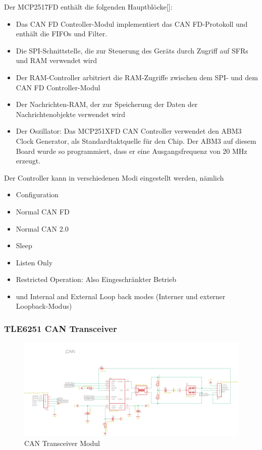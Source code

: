 Der MCP2517FD enthält die folgenden Hauptblöcke[\cite{Transmission2018}]:
\begin{itemize}
	\item Das CAN FD Controller-Modul implementiert das CAN FD-Protokoll und enthält die FIFOs und Filter.
	\item Die SPI-Schnittstelle, die zur Steuerung des Geräts durch Zugriff auf SFRs und RAM verwendet wird
	\item Der RAM-Controller arbitriert die RAM-Zugriffe zwischen dem SPI- und dem CAN FD Controller-Modul
	\item Der Nachrichten-RAM, der zur Speicherung der Daten der Nachrichtenobjekte verwendet wird
	\item Der Oszillator: Das MCP251XFD CAN Controller verwendet den ABM3 Clock Generator, als Standardtaktquelle für den Chip. Der ABM3 auf diesem Board wurde so programmiert, dass er eine Ausgangsfrequenz von 20 MHz erzeugt.
	
\end{itemize}

Der Controller kann in verschiedenen Modi eingestellt werden, nämlich
\begin{itemize}
	\item Configuration
	\item Normal CAN FD
	\item Normal CAN 2.0
	\item Sleep
	\item Listen Only
	\item Restricted Operation: Also Eingeschränkter Betrieb
	\item und Internal and External Loop back modes (Interner und externer Loopback-Modus)
\end{itemize}
\subsubsection{TLE6251 CAN Transceiver}

\begin{figure}[h]
	\begin{center}
		\includegraphics[width=1.2\textwidth]{./images/can_transceiver_eagle.jpg}
	\end{center}
	\vspace{-5pt}
	\caption[CAN Transceiver Modul]{CAN Transceiver Modul} %
	\label{fig:can:transceiver}
	\vspace{-5pt}
\end{figure}

